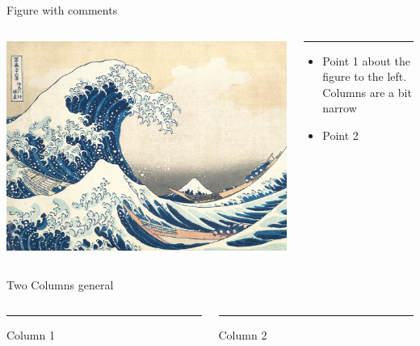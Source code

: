 \documentclass{beamer}
\begin{document}
\begin{frame}{Figure with comments}
    \begin{columns}[T] %
    \begin{column}{.62\textwidth}
        \includegraphics[width= \linewidth]{img/kanagawa.jpg}
    \end{column}%

    \begin{column}{.38\textwidth}
        {\color{buff-gold}\rule{\linewidth}{4pt}}
        
        \begin{itemize}[leftmargin=0cm]
            \item Point 1 about the figure to the left. Columns are a bit narrow
            \item Point 2
        \end{itemize}
    \end{column}%
    \end{columns}
\end{frame}



\begin{frame}{Two Columns general}
    \begin{columns}[T] %
    \begin{column}{.50\textwidth}
        {\color{buff-gold}\rule{\linewidth}{4pt}}
        Column 1
    \end{column}
    
    \hfill
    
    \begin{column}{.50\textwidth}
        {\color{buff-gold}\rule{\linewidth}{4pt}}
        Column 2
    \end{column}
    \end{columns}
\end{frame}
\end{document}

